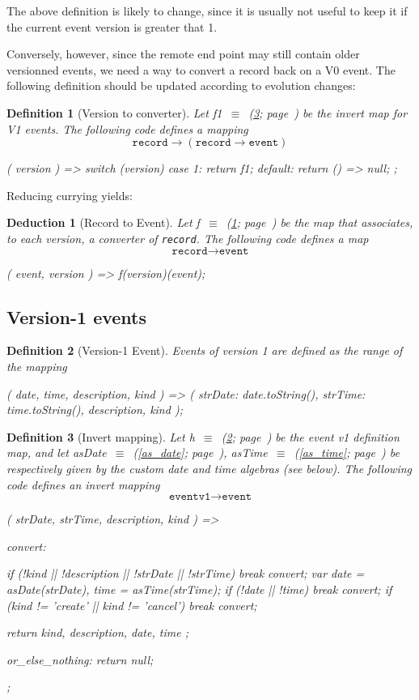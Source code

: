 \documentclass[12pt,a4paper]{report}
\newtheorem{definition}{Definition}
\newtheorem{deduction}{Deduction}
\newcommand{\word}[1]{\texttt{#1}}
\newcommand{\symboldef}[2]{#1\ $\equiv$\ (\ref{#2}; page~\pageref{#2})}
\begin{document}
The above definition is likely to change, since it is usually not useful
to keep it if the current event version is greater that 1.

Conversely, however, since the remote end point may still contain older versionned
events, we need a way to convert a record back on a V0 event.
The following definition should be updated according to evolution changes:

\begin{definition}[Version to converter]\label{version_to_record_converter}
Let \symboldef{f1}{event_v1_invert} be the invert map for V1 events.
The following code defines a mapping
	\[ \word{record}\to (\word{record}\to \word{event})\]
\begin{code}
({ version }) => {
  switch (version) {
    case 1:  return f1;
    default: return () => null;
  }
};
\end{code}
\end{definition}

Reducing currying yields:
\begin{deduction}[Record to Event]\label{record_to_event_converter}
Let \symboldef{f}{version_to_record_converter} be the map that associates, to
each version, a converter of \word{record}. The following code defines a map
	\[ \word{record}\to \word{event}\]
\begin{code}
({ event, version }) => f(version)(event);
\end{code}
\end{deduction}

\subsection{Version-1 events}

\begin{definition}[Version-1 Event]\label{event_v1}
Events of version 1 are defined as the range of the mapping
\begin{code}
({ date, time, description, kind }) => ({
  strDate: date.toString(),
  strTime: time.toString(),
  description,
  kind
});
\end{code}
\end{definition}

\begin{definition}[Invert mapping]\label{event_v1_invert}
Let \symboldef{h}{event_v1} be the event v1 definition map, and
let \symboldef{asDate}{as_date}, \symboldef{asTime}{as_time}
be respectively given by the custom date and time algebras (see below).
The following code defines an invert mapping
	\[ \word{eventv1}\to \word{event} \]
\begin{code}
({ strDate, strTime, description, kind }) => {
  convert: {
    if (!kind || !description || !strDate || !strTime)
      break convert;
    var date = asDate(strDate),
        time = asTime(strTime);
    if (!date || !time) break convert;
    if (kind != 'create' || kind != 'cancel') break convert;

    return { kind, description, date, time };
  } or_else_nothing: {
    return null;
  }
};
\end{code}
\end{definition}
\end{document}
